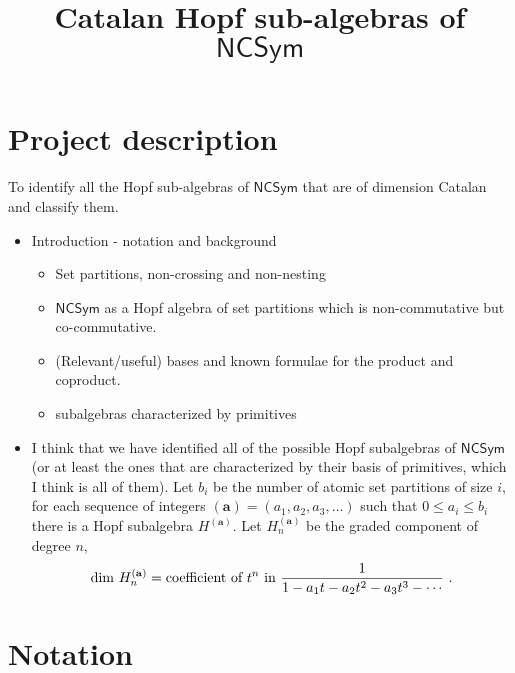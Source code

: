 \documentclass[11pt]{amsart}
\title{Catalan Hopf sub-algebras of $\mathsf{NCSym}$}
\author{}
\theoremstyle{definition}
\numberwithin{equation}{section}
\begin{document}
\maketitle

\section{Project description}

\noindent
To identify all the Hopf sub-algebras of $\mathsf{NCSym}$ that are of dimension Catalan and classify them.


\begin{itemize}
\item Introduction - notation and background
\cite{AT20, BBT14, BHRZ05, B08, BZ09, F12, LM11, NT05, RS06}
\cite{S09}
\begin{itemize}
\item Set partitions, non-crossing and non-nesting
\item $\mathsf{NCSym}$ as a Hopf algebra of set partitions which is non-commutative but co-commutative.
\item (Relevant/useful) bases and known formulae for the product and coproduct.
\item subalgebras characterized by primitives
\end{itemize}
\item I think that we have identified all of the possible Hopf subalgebras of $\mathsf{NCSym}$
(or at least the ones that are characterized by their basis of primitives, which I think is all of them).
Let $b_i$ be the number of atomic set partitions of size $i$, for each sequence of integers $(\mathbf{a}) = (a_1, a_2, a_3,\ldots)$ such that
$0 \leq a_i \leq b_i$ there is a Hopf subalgebra $H^{(\mathbf{a})}$.
Let $H^{(\mathbf{a})}_n$ be the graded component of degree $n$,
$$\mathrm{dim}~H^{(\mathbf{a})}_n = \hbox{coefficient of }t^n\hbox{ in }\frac{1}{1 - a_1 t - a_2 t^2 - a_3 t^3 - \cdots}~.$$
\end{itemize}

\section{Notation}
\end{document}
